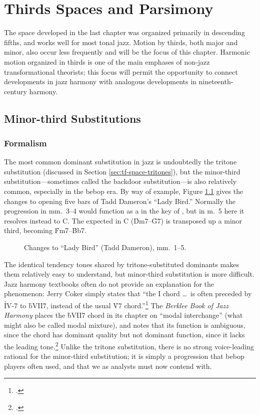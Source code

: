 
\chapter{Thirds Spaces and Parsimony}

The space developed in the last chapter was organized primarily in descending
fifths, and works well for most tonal jazz. Motion by thirds, both major and
minor, also occur less frequently and will be the focus of this chapter.
Harmonic motion organized in thirds is one of the main emphases of non-jazz
transformational theorists; this focus will permit the opportunity to
connect developments in jazz harmony with analogous developments in
nineteenth-century harmony.

\section{Minor-third Substitutions}
\label{sec:minor-third-subst}

\subsection{Formalism}
\label{sec:m3-formalism}

The most common dominant substitution in jazz is undoubtedly the tritone
substitution (discussed in Section \ref{sec:tf-space-tritones}), but the
minor-third substitution---sometimes called the backdoor substitution---is also
relatively common, especially in the bebop era. By way of example, Figure
\ref{mts:ladybird-changes} gives the changes to opening five bars of Tadd
Dameron's ``Lady Bird.'' Normally the progression in mm.~3--4 would function
as a \tf in the key of \Eflat, but in m.~5 here it resolves instead to C. The
expected \tf in C (\h{Dm7}--\h{G7}) is transposed up a minor third, becoming
\h{Fm7}--\h{Bb7}.

\begin{figure}[tbp]
  \caption{Changes to ``Lady Bird'' (Tadd Dameron), mm.~1--5.}
  \label{mts:ladybird-changes}
\end{figure}

The identical tendency tones shared by tritone-substituted dominants makes
them relatively easy to understand, but minor-third substitution is more
difficult. Jazz harmony textbooks often do not provide an explanation for the
phenomenon: Jerry Coker simply states that ``the I chord \ldots\ is often
preceded by \h{IV-7} to \h{bVII7}, instead of the usual \h{V7}
chord.''\footcite[82]{coker:elements} The \emph{Berklee Book of Jazz Harmony}
places the \h{bVII7} chord in its chapter on ``modal interchange'' (what might
also be called modal mixture), and notes that its function is ambiguous, since
the chord has dominant quality but not dominant function, since it lacks the
leading tone.\footcite[123--24]{berklee:harmony} Unlike the tritone
substitution, there is no strong voice-leading rational for the minor-third
substitution; it is simply a progression that bebop players often used, and
that we as analysts must now contend with.


